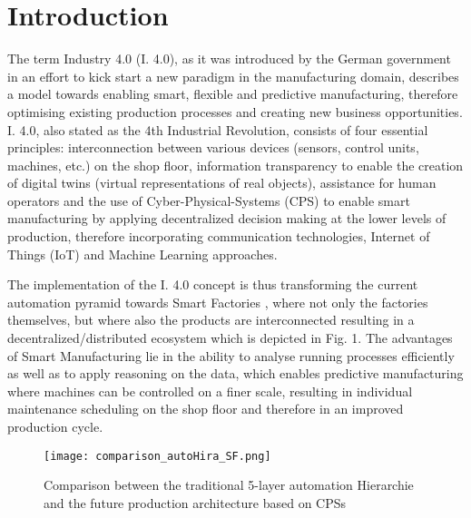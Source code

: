 \section{Introduction}\label{sec:introduction}

The term Industry 4.0 (I. 4.0), as it was introduced by the German government in an effort to kick start a new paradigm in the manufacturing domain, describes a model towards enabling smart, flexible and predictive manufacturing, therefore optimising existing production processes and creating new business opportunities. \cite{i40gov} I. 4.0, also stated as the 4th Industrial Revolution\cite{revolution}, consists of four essential principles: interconnection between various devices (sensors, control units, machines, etc.) on the shop floor, information transparency to enable the creation of digital twins (virtual representations of real objects), assistance for human operators and the use of Cyber-Physical-Systems (CPS) to enable smart manufacturing by applying decentralized decision making at the lower levels of production, therefore incorporating communication technologies, Internet of Things (IoT) and Machine Learning approaches. \cite{design}  

The implementation of the I. 4.0 concept is thus transforming the current automation pyramid \cite{autoPy} towards Smart Factories \cite{smartFac}, where not only the factories themselves, but where also the products are interconnected resulting in a decentralized/distributed ecosystem which is depicted in Fig. 1. The advantages of Smart Manufacturing lie in the ability to analyse running processes efficiently as well as to apply reasoning on the data, which enables predictive manufacturing where machines can be controlled on a finer scale, resulting in individual maintenance scheduling on the shop floor and therefore in an improved production cycle.\cite{cpsAdv}

\begin{figure}
	\centering
	\texttt{[image: comparison\_autoHira\_SF.png]}
	\caption{Comparison between the traditional 5-layer automation Hierarchie and the future production architecture based on CPSs}
\end{figure}

